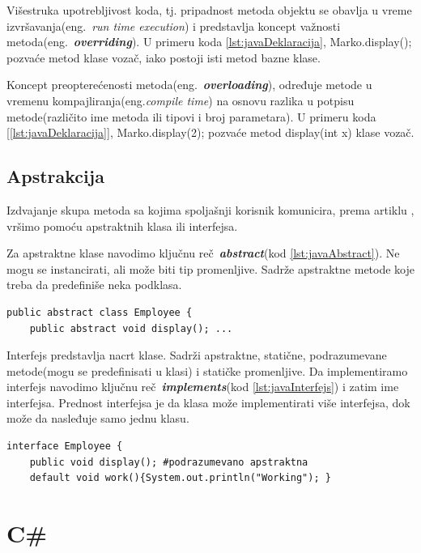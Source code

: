 \documentclass[a4paper]{article}
\begin{document}
{Višestruka upotrebljivost koda, tj. pripadnost metoda objektu se obavlja u vreme izvršavanja(eng.~{\em run time execution}) i predstavlja koncept važnosti metoda(eng.~{\em\textbf{overriding}})\cite{horstmann2017core}. U primeru koda \ref{lst:javaDeklaracija}, Marko.display(); pozvaće metod klase vozač, iako postoji isti metod bazne klase.

Koncept preopterećenosti metoda(eng.~{\em\textbf{overloading}})\cite{horstmann2017core}, određuje metode u vremenu kompajliranja(eng.{\em compile time}) na osnovu razlika u potpisu metode(različito ime metoda ili tipovi i broj parametara). U primeru koda [\ref{lst:javaDeklaracija}], Marko.display(2); pozvaće metod display(int x) klase vozač.

\subsection{Apstrakcija}
\label{subsec:javaApstrakcija}

Izdvajanje skupa metoda sa kojima spoljašnji korisnik komunicira, prema artiklu \cite{oopJava}, vršimo pomoću apstraktnih klasa ili interfejsa.

Za apstraktne klase navodimo ključnu reč~{\em \textbf{abstract}}(kod \ref{lst:javaAbstract}). Ne mogu se instancirati, ali može biti tip promenljive. Sadrže apstraktne metode koje treba da predefiniše neka podklasa.

\begin{lstlisting}[caption={Apstraktna klasa},frame=single, label=lst:javaAbstract]
public abstract class Employee {
	public abstract void display(); ...
\end{lstlisting}

Interfejs predstavlja nacrt klase. Sadrži apstraktne, statične, podrazumevane metode(mogu se predefinisati u klasi) i statičke promenljive. Da implementiramo interfejs navodimo ključnu reč~{\em \textbf{implements}}(kod \ref{lst:javaInterfejs}) i zatim ime interfejsa. Prednost interfejsa\cite{horstmann2017core} je da klasa može implementirati više interfejsa, dok može da nasleđuje samo jednu klasu.

\begin{lstlisting}[caption={Interfejs},frame=single, label=lst:javaInterfejs]
interface Employee {
	public void display(); #podrazumevano apstraktna
	default void work(){System.out.println("Working"); }
\end{lstlisting}


\section{C\#}
\label{sec:csharp}

}
\end{document}
